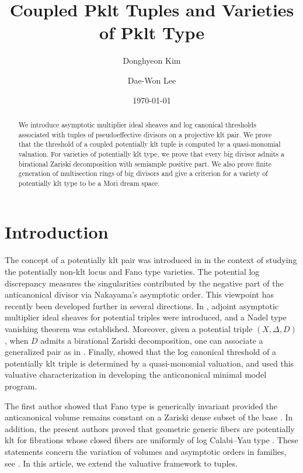 \documentclass[a4paper,12pt]{amsart}
\title[]{Coupled Pklt Tuples and Varieties of Pklt Type}
\author[D. Kim]{Donghyeon Kim}
\author[D.-W. Lee]{Dae-Won Lee}
\date{\today}
\theoremstyle{plain}
\theoremstyle{definition}
\numberwithin{equation}{section}
\begin{document}
\begin{abstract}
We introduce asymptotic multiplier ideal sheaves and log canonical thresholds associated with tuples of pseudoeffective divisors on a projective klt pair. We prove that the threshold of a coupled potentially klt tuple is computed by a quasi-monomial valuation. For varieties of potentially klt type, we prove that every big divisor admits a birational Zariski decomposition with semiample positive part. We also prove finite generation of multisection rings of big divisors and give a criterion for a variety of potentially klt type to be a Mori dream space.
\end{abstract}

\maketitle



\section{Introduction}

The concept of a potentially klt pair was introduced in \cite{CP} in the context of studying the potentially non-klt locus and Fano type varieties. The potential log discrepancy measures the singularities contributed by the negative part of the anticanonical divisor via Nakayama’s asymptotic order. This viewpoint has recently been developed further in several directions. In \cite{CJK}, adjoint asymptotic multiplier ideal sheaves for potential triples were introduced, and a Nadel type vanishing theorem was established. Moreover, given a potential triple $(X,\Delta,D)$, when $D$ admits a birational Zariski decomposition, one can associate a generalized pair as in \cite{CJL2}. Finally, \cite[Theorem 1.1 and Corollary 1.3]{CJKL} showed that the log canonical threshold of a potentially klt triple is determined by a quasi-monomial valuation, and used this valuative characterization in developing the anticanonical minimal model program.

The first author showed that Fano type is generically invariant provided the anticanonical volume remains constant on a Zariski dense subset of the base \cite[Theorem 1.2]{Kim25}. In addition, the present authors proved that geometric generic fibers are potentially klt for fibrations whose closed fibers are uniformly of log Calabi--Yau type \cite[Theorem 1.2]{KL25}. These statements concern the variation of volumes and asymptotic orders in families, see \cite[Theorem 1.1]{Jun26}. In this article, we extend the valuative framework to tuples.
\end{document}
